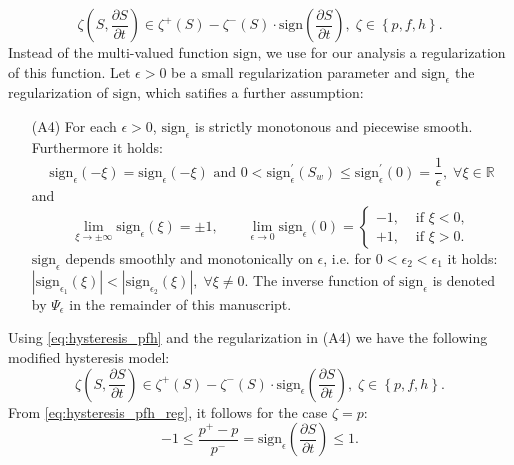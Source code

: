 \documentclass[smallextended]{svjour3}       %
\begin{document}
\begin{equation}
\label{eq:hysteresis_pfh}
\zeta \left( S, \frac{\partial S}{\partial t} \right) \in \zeta^+\left( S \right) - \zeta ^-\left( S \right) \cdot \text{sign} \left( \frac{\partial S}{\partial t} \right),\; 
\zeta \in \left\{ p,f,h \right\}.
\end{equation}
Instead of the multi-valued function $\text{sign}$, we use for our analysis a regularization of this function. Let $\epsilon>0$ be a small regularization parameter
and $\text{sign}_\epsilon$ the regularization of $\text{sign}$, which satifies a further assumption:
\;
\begin{itemize}
 \item[(A4)] For each $\epsilon >0$, $\text{sign}_\epsilon$ is strictly monotonous and piecewise smooth. Furthermore it holds:
 $$
 \text{sign}_\epsilon \left( -\xi \right) = \text{sign}_\epsilon \left( -\xi \right) \text{ and } 0 < \text{sign}_\epsilon^\prime \left(S_w \right) \leq 
 \text{sign}_\epsilon^\prime\left(0 \right) =  \frac{1}{\epsilon}, \; \forall \xi \in \mathbb{R}
 $$
 and
 $$
 \lim_{\xi \rightarrow \pm \infty} \text{sign}_\epsilon \left( \xi \right) = \pm 1,\qquad \lim_{\epsilon \rightarrow 0}\text{sign}_\epsilon \left( 0 \right) 
 = 
 \begin{cases}
  -1, &\text{ if } \xi < 0,\\
  +1, &\text{ if } \xi > 0.
 \end{cases}
 $$
 $\text{sign}_\epsilon$ depends smoothly and monotonically on $\epsilon$, i.e. for $0<\epsilon_2<\epsilon_1$ it holds: 
 $\left| \text{sign}_{\epsilon_1} \left( \xi \right) \right| < \left| \text{sign}_{\epsilon_2} \left( \xi \right) \right|, \; \forall \xi \neq 0.$
The inverse function of $\text{sign}_\epsilon$ is denoted by $\Psi_\epsilon$ in the remainder of this manuscript.
\end{itemize}
\;
Using \eqref{eq:hysteresis_pfh} and the regularization in (A4) we have the following modified hysteresis model:
\begin{equation}
\label{eq:hysteresis_pfh_reg}
\zeta \left( S, \frac{\partial S}{\partial t} \right) \in \zeta^+\left( S \right) - \zeta ^-\left( S \right) \cdot \text{sign}_\epsilon \left( \frac{\partial S}{\partial t} \right),\; 
\zeta \in \left\{ p,f,h \right\}.
\end{equation}
From \eqref{eq:hysteresis_pfh_reg}, it follows for the case $\zeta = p$:
\begin{equation*}
-1 \leq \frac{p^+-p}{p^-} = \text{sign}_\epsilon \left( \frac{\partial S}{\partial t} \right) \leq 1.
\end{equation*}
\end{document}
